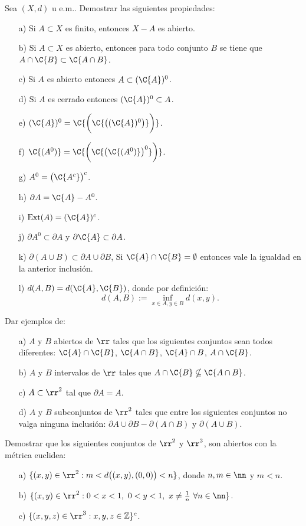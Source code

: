 \begin{ejercicio}{} Sea $(X,d)$ u e.m.. Demostrar las siguientes
propiedades:
\begin{itemize}
	\item[a)] Si $A\subset X$ es finito, entonces $X-A$ es abierto.
	\item[b)] Si $A\subset X$ es abierto, entonces para todo
	conjunto $B$ se tiene que $A\cap \C{B}\subset \C{A\cap B}$.
	\item[c)] Si $A$ es abierto entonces $A\subset (\C{A})^0$.
	\item[d)] Si $A$ es cerrado entonces $(\C{A})^0\subset A$.
	\item[e)]
	$(\C{A})^0=\C{\biggl(\C{\bigl((\C{A})^0\bigr)}\biggr)}$.
	\item[f)]
	$\C{(A^0)}=\C{\biggl(\C{\bigl(\C{(A^0)}\bigr)^0}\biggr)}$.
	\item[g)] $A^0=\bigl(\C{A^c}\bigr)^c$.
	\item[h)] $\partial A=\C{A}-A^0$.
	\item[i)] $\text{Ext}(A)=(\C{A})^c$.
	\item[j)] $\partial A^0\subset \partial A$ y $\partial
	\C{A}\subset \partial A$.
	\item[k)] $\partial (A\cup B)\subset \partial A\cup\partial
	B$, Si $\C{A}\cap\C{B}=\emptyset$ entonces vale la igualdad en
	la anterior inclusión.
	\item[l)] $d(A,B)=d(\C{A},\C{B})$, donde por definición:
	\[
		d(A,B):=\inf\limits_{x\in A,y\in B}d(x,y).
	\]
\end{itemize}
\end{ejercicio}
\begin{ejercicio}{} Dar ejemplos de:
\begin{itemize}
\item[a)] $A$ y $B$ abiertos de $\rr$ tales que los siguientes
conjuntos sean todos diferentes: $\C{A}\cap \C{B}$, $\C{A\cap B}$,
$\C{A}\cap B$, $A\cap \C{B}$.
\item[b)] $A$ y $B$ intervalos de $\rr$ tales que
$A\cap\C{B}\nsubseteq \C{A\cap B}$.
\item[c)] $A\subset \rr^2$ tal que $\partial A=A$.
\item[d)] $A$ y $B$ subconjuntos de $\rr^2$ tales que entre los
siguientes conjuntos no valga ninguna inclusión: $\partial
A\cup\partial B-\partial(A\cap B)$ y $\partial (A\cup B)$.
\end{itemize}
\end{ejercicio}
\begin{ejercicio}{} Demostrar que los siguientes conjuntos de
$\rr^2$ y $\rr^3$, son abiertos con la métrica euclidea:
\begin{itemize}
\item[a)] $\{(x,y)\in\rr^2: m<d\bigl((x,y),(0,0)\bigr)<n\}$, donde
$n,m\in\nn$ y $m<n$.
\item[b)] $\{(x,y)\in\rr^2: 0<x<1,\,\, 0<y<1,\,\,x\neq
\frac1n\,\,\forall n\in\nn\}$.
\item[c)] $\{(x,y,z)\in\rr^3: x,y,z\in\mathbb{Z}\}^c$.
\end{itemize}
\end{ejercicio}
